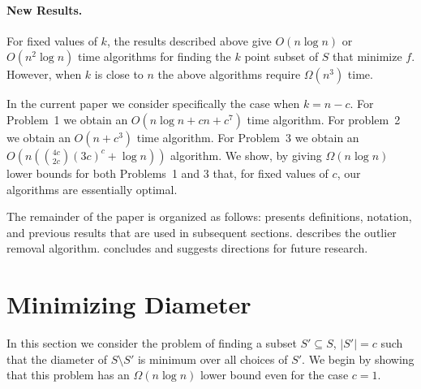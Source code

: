 \documentclass[lotsofwhite]{patmorin}
\newcommand{\runtime}{n\left({4c\choose 2c}(3c)^c + \log n\right)}
\newcommand{\Oruntime}{O\left(\runtime\right)}
\begin{document}

\paragraph{New Results.}

For fixed values of $k$, the results described above give $O(n\log n)$
or $O(n^2\log n)$ time algorithms for finding the $k$ point subset of
$S$ that minimize $f$.  However, when $k$ is close to $n$ the above
algorithms require $\Omega(n^3)$ time.  

In the current paper we consider specifically the case when $k=n-c$.
For Problem~1 we obtain an $O(n\log n + cn + c^7)$ time algorithm.
For problem~2 we obtain an $O(n + c^3)$ time algorithm.  For Problem~3
we obtain an $\Oruntime$ algorithm.  We show, by giving $\Omega(n\log
n)$ lower bounds for both Problems~1 and 3 that, for fixed values of
$c$, our algorithms are essentially optimal.



The remainder of the paper is organized as follows:
 presents definitions, notation, and previous
results that are used in subsequent sections. 
describes the outlier removal algorithm. 
concludes and suggests directions for future research.


\section{Minimizing Diameter}

In this section we consider the problem of finding a subset
$S'\subseteq S$, $|S'|=c$ such that the diameter of $S\setminus S'$ is
minimum over all choices of $S'$.  We begin by showing that this
problem has an $\Omega(n\log n)$ lower bound even for the case $c=1$.
\end{document}
